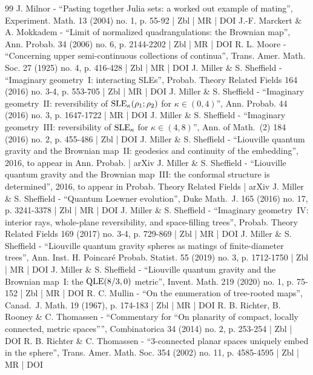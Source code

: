 \documentclass[10pt]{amsart}
\theoremstyle{plain}
\numberwithin{theorem}{section}
\theoremstyle{definition}
\begin{document}
\begin{thebibliography}{99}
J. Milnor - “Pasting together Julia sets: a worked out example of mating”, Experiment. Math. 13 (2004) no. 1, p. 55-92 | Zbl | MR | DOI
J.-F. Marckert \& A. Mokkadem - “Limit of normalized quadrangulations: the Brownian map”, Ann. Probab. 34 (2006) no. 6, p. 2144-2202 | Zbl | MR | DOI
R. L. Moore - “Concerning upper semi-continuous collections of continua”, Trans. Amer. Math. Soc. 27 (1925) no. 4, p. 416-428 | Zbl | MR | DOI
J. Miller \& S. Sheffield - “Imaginary geometry I: interacting SLEs”, Probab. Theory Related Fields 164 (2016) no. 3-4, p. 553-705 | Zbl | MR | DOI
J. Miller \& S. Sheffield - “Imaginary geometry II: reversibility of ${\rm SLE}_\kappa (\rho _1;\rho _2)$ for $\kappa \in (0,4)$”, Ann. Probab. 44 (2016) no. 3, p. 1647-1722 | MR | DOI
J. Miller \& S. Sheffield - “Imaginary geometry III: reversibility of $\rm SLE_\kappa $ for $\kappa \in (4,8)$”, Ann. of Math. (2) 184 (2016) no. 2, p. 455-486 | Zbl | DOI
J. Miller \& S. Sheffield - “Liouville quantum gravity and the Brownian map II: geodesics and continuity of the embedding”, 2016, to appear in Ann. Probab. | arXiv
J. Miller \& S. Sheffield - “Liouville quantum gravity and the Brownian map III: the conformal structure is determined”, 2016, to appear in Probab. Theory Related Fields | arXiv
J. Miller \& S. Sheffield - “Quantum Loewner evolution”, Duke Math. J. 165 (2016) no. 17, p. 3241-3378 | Zbl | MR | DOI
J. Miller \& S. Sheffield - “Imaginary geometry IV: interior rays, whole-plane reversibility, and space-filling trees”, Probab. Theory Related Fields 169 (2017) no. 3-4, p. 729-869 | Zbl | MR | DOI
J. Miller \& S. Sheffield - “Liouville quantum gravity spheres as matings of finite-diameter trees”, Ann. Inst. H. Poincaré Probab. Statist. 55 (2019) no. 3, p. 1712-1750 | Zbl | MR | DOI
J. Miller \& S. Sheffield - “Liouville quantum gravity and the Brownian map I: the ${\rm QLE}(8/3,0)$ metric”, Invent. Math. 219 (2020) no. 1, p. 75-152 | Zbl | MR | DOI
R. C. Mullin - “On the enumeration of tree-rooted maps”, Canad. J. Math. 19 (1967), p. 174-183 | Zbl | MR | DOI
R. B. Richter, B. Rooney \& C. Thomassen - “Commentary for “On planarity of compact, locally connected, metric spaces””, Combinatorica 34 (2014) no. 2, p. 253-254 | Zbl | DOI
R. B. Richter \& C. Thomassen - “3-connected planar spaces uniquely embed in the sphere”, Trans. Amer. Math. Soc. 354 (2002) no. 11, p. 4585-4595 | Zbl | MR | DOI

\end{thebibliography}
\end{document}

